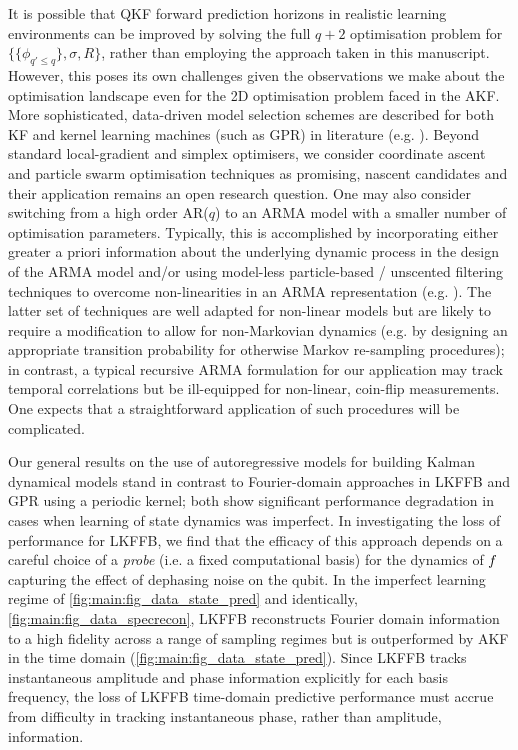 It is possible that QKF forward prediction horizons in realistic learning environments can be improved by solving the full $q+2$ optimisation problem for $\{\{ \phi_{q' \leq q}\}, \sigma, R\}$, rather than employing the approach taken in this manuscript. However, this poses its own challenges given the observations we make about the optimisation landscape even for the 2D optimisation problem faced in the AKF.  More sophisticated, data-driven model selection schemes are described for both KF and kernel learning machines (such as GPR) in literature (e.g. \cite{arlot2009data, vu2015understanding}). Beyond standard local-gradient and simplex optimisers, we consider coordinate ascent \cite{abbeel2005} and particle swarm optimisation techniques \cite{robertson2017particle} as promising, nascent candidates and their application remains an open research question. One may also consider switching from a high order AR($q$) to an ARMA model with a smaller number of optimisation parameters. Typically, this is accomplished by incorporating either greater a priori information about the underlying dynamic process in the design of the ARMA model and/or using model-less particle-based / unscented filtering techniques to overcome non-linearities in an ARMA representation (e.g. \cite{dong2009unscented}). The latter set of techniques are well adapted for non-linear models but are likely to require a modification to allow for non-Markovian dynamics (e.g. by designing an appropriate transition probability for otherwise Markov re-sampling procedures); in contrast, a typical recursive ARMA formulation for our application may track temporal correlations but be ill-equipped for non-linear, coin-flip measurements. One expects that a straightforward application of such procedures will be complicated.
 
Our general results on the use of autoregressive models for building Kalman dynamical models stand in contrast to Fourier-domain approaches in LKFFB and GPR using a periodic kernel;  both show significant performance degradation in cases when learning of state dynamics was imperfect.  In investigating the loss of performance for LKFFB, we find that the efficacy of this approach depends on a careful choice of a \textit{probe} (i.e. a fixed computational basis) for the dynamics of $f$ capturing the effect of dephasing noise on the qubit.  In the imperfect learning regime of \cref{fig:main:fig_data_state_pred} and identically, \cref{fig:main:fig_data_specrecon}, LKFFB reconstructs Fourier domain information to a high fidelity across a range of sampling regimes but is outperformed by AKF in the time domain (\cref{fig:main:fig_data_state_pred}). Since LKFFB tracks instantaneous amplitude and phase information explicitly for each basis frequency, the loss of LKFFB time-domain predictive performance must accrue from difficulty in tracking instantaneous phase, rather than amplitude, information. 

